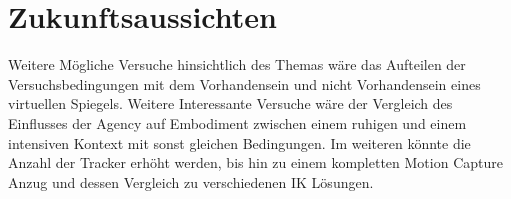 \section{Zukunftsaussichten}
Weitere Mögliche Versuche hinsichtlich des Themas wäre das Aufteilen der Versuchsbedingungen mit dem Vorhandensein und nicht Vorhandensein eines virtuellen Spiegels. Weitere Interessante Versuche wäre der Vergleich des Einflusses der Agency auf Embodiment zwischen einem ruhigen und einem intensiven Kontext mit sonst gleichen Bedingungen. Im weiteren könnte die Anzahl der Tracker erhöht werden, bis hin zu einem kompletten Motion Capture Anzug und dessen Vergleich zu verschiedenen IK Lösungen.